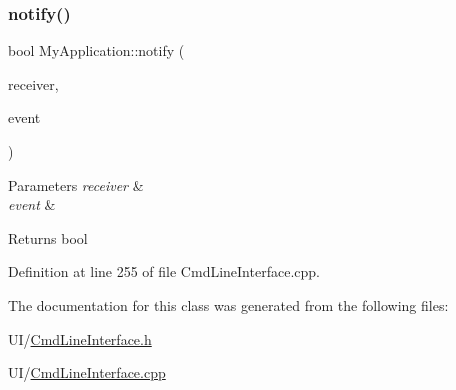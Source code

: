 \subsubsection{\texorpdfstring{notify()}{notify()}}
{\footnotesize\ttfamily bool My\+Application\+::notify (\begin{DoxyParamCaption}\item[{Q\+Object $\ast$}]{receiver,  }\item[{Q\+Event $\ast$}]{event }\end{DoxyParamCaption})}


\begin{DoxyParams}{Parameters}
{\em receiver} & \\
\hline
{\em event} & \\
\hline
\end{DoxyParams}
\begin{DoxyReturn}{Returns}
bool 
\end{DoxyReturn}


Definition at line 255 of file Cmd\+Line\+Interface.\+cpp.



The documentation for this class was generated from the following files\+:\begin{DoxyCompactItemize}
\item 
U\+I/\hyperlink{_cmd_line_interface_8h}{Cmd\+Line\+Interface.\+h}\item 
U\+I/\hyperlink{_cmd_line_interface_8cpp}{Cmd\+Line\+Interface.\+cpp}\end{DoxyCompactItemize}
